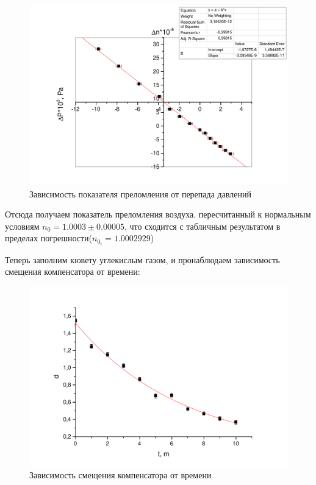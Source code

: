 \documentclass[a4paper,12pt]{article}
\begin{document}
	\begin{figure}[h!]
		\begin{center}
			\includegraphics[width = \linewidth]{dndp}
			\caption{Зависимость показателя преломления от перепада давлений}
		\end{center}
	\end{figure}
	
	Отсюда получаем показатель преломления воздуха. пересчитанный к нормальным условиям $ n_0 = 1.0003\pm 0.00005$, что сходится с табличным результатом в пределах погрешности($n_{0_{t}} = 1.0002929$)
	
	Теперь заполним кювету углекислым газом, и пронаблюдаем зависимость смещения компенсатора от времени:
	
	\begin{figure}[h!]
		\begin{center}
			\includegraphics[width = \linewidth]{dt}
			\caption{Зависимость смещения компенсатора от времени}
		\end{center}
	\end{figure}
	
\end{document}
